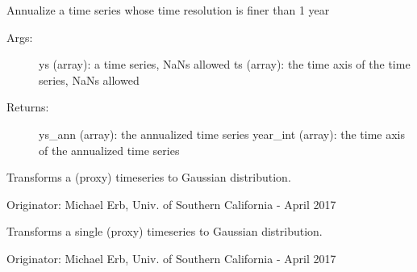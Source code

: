\documentclass[letterpaper,10pt,english]{sphinxmanual}
\begin{document}

\begin{fulllineitems}
\label{\detokenize{Timeseries:pyleoclim.Timeseries.annualize}}
Annualize a time series whose time resolution is finer than 1 year
\begin{description}
\item[{Args:}] \leavevmode
ys (array): a time series, NaNs allowed
ts (array): the time axis of the time series, NaNs allowed

\item[{Returns:}] \leavevmode
ys\_ann (array): the annualized time series
year\_int (array): the time axis of the annualized time series

\end{description}

\end{fulllineitems}


\begin{fulllineitems}
\label{\detokenize{Timeseries:pyleoclim.Timeseries.gaussianize}}
Transforms a (proxy) timeseries to Gaussian distribution.

Originator: Michael Erb, Univ. of Southern California - April 2017

\end{fulllineitems}


\begin{fulllineitems}
\label{\detokenize{Timeseries:pyleoclim.Timeseries.gaussianize_single}}
Transforms a single (proxy) timeseries to Gaussian distribution.

Originator: Michael Erb, Univ. of Southern California - April 2017

\end{fulllineitems}
\end{document}
